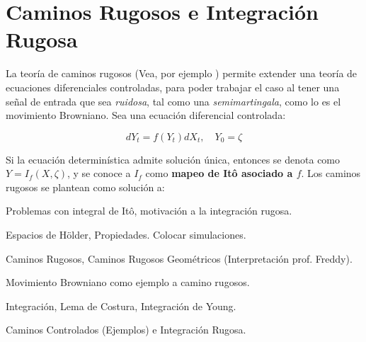 \chapter{Caminos Rugosos e Integración Rugosa}

La teoría de caminos rugosos (Vea, por ejemplo \cite{Rough_Paths_TL})  permite extender una teoría de ecuaciones diferenciales controladas, para poder trabajar el caso al tener una señal de entrada que sea \textit{ruidosa}, tal como una \textit{semimartingala}, como lo es el movimiento Browniano. Sea una ecuación diferencial controlada:

\[
	d Y_t = f(Y_t) dX_t, \quad Y_0 = \zeta
\]

Si la ecuación determinística admite solución única, entonces se denota como $Y = I_f(X, \zeta)$, y se conoce a $I_f$ como \textbf{mapeo de Itô asociado a $f$}. Los caminos rugosos se plantean como solución a:

Problemas con integral de Itô, motivación a la integración rugosa.

Espacios de Hölder, Propiedades.
Colocar simulaciones.

Caminos Rugosos, Caminos Rugosos Geométricos (Interpretación prof. Freddy).

Movimiento Browniano como ejemplo a camino rugosos.

Integración, Lema de Costura, Integración de Young.

Caminos Controlados (Ejemplos) e Integración Rugosa.